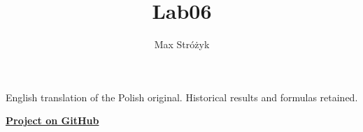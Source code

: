 \documentclass[a4paper, 11pt]{article}
\title{Lab06}
\author{Max Stróżyk}
\begin{document}
\maketitle
\begin{center}\small English translation of the Polish original. Historical results and formulas retained.\end{center}
\tableofcontents
\begin{center}
    \href{https://github.com/maxi7524/coursework/tree/main/courses/numerical-methods/assignments/lab-06}{\textbf{Project on GitHub}}
\end{center}


\newpage


\newpage
\end{document}
